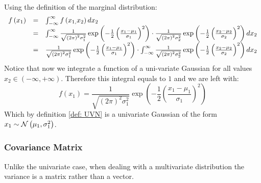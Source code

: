 \begin{exercise}
Using the definition of the marginal distribution:
$$
\begin{array}{ccl}
	f\left(x_{1}\right) & = & \intop_{-\infty}^{\infty}f\left(x_{1,}x_{2}\right)dx_{2}\\
	& = & \intop_{-\infty}^{\infty}\frac{1}{\sqrt{\left(2\pi\right)^{2}\sigma_{1}^{2}}}\exp\left(-\frac{1}{2}\left(\frac{x_{1}-\mu_{1}}{\sigma_{1}}\right)^{2}\right)\cdot\frac{1}{\sqrt{\left(2\pi\right)^{2}\sigma_{2}^{2}}}\exp\left(-\frac{1}{2}\left(\frac{x_{2}-\mu_{2}}{\sigma_{2}}\right)^{2}\right)dx_{2}\\
	& = & \frac{1}{\sqrt{\left(2\pi\right)^{2}\sigma_{1}^{2}}}\exp\left(-\frac{1}{2}\left(\frac{x_{1}-\mu_{1}}{\sigma_{1}}\right)^{2}\right)\cdot\intop_{-\infty}^{\infty}\frac{1}{\sqrt{\left(2\pi\right)^{2}\sigma_{2}^{2}}}\exp\left(-\frac{1}{2}\left(\frac{x_{2}-\mu_{2}}{\sigma_{2}}\right)^{2}\right)dx_{2}
\end{array}
$$
Notice that now we integrate a function of a uni-variate Gaussian for all values $x_2\in\left(-\infty,+\infty\right)$. Therefore this integral equals to $1$ and we are left with:
$$ f\left(x_1\right) = \frac{1}{\sqrt{\left(2\pi\right)^{2}\sigma_{1}^{2}}}\exp\left(-\frac{1}{2}\left(\frac{x_{1}-\mu_{1}}{\sigma_{1}}\right)^{2}\right) $$
Which by definition \ref{def: UVN} is a univariate Gaussian of the form $x_1\sim\mathcal{N}\left(\mu_1,\sigma_1^2\right)$.
\end{exercise}



\subsubsection{Covariance Matrix}
Unlike the univariate case, when dealing with a multivariate distribution the variance is a matrix rather than a vector.

